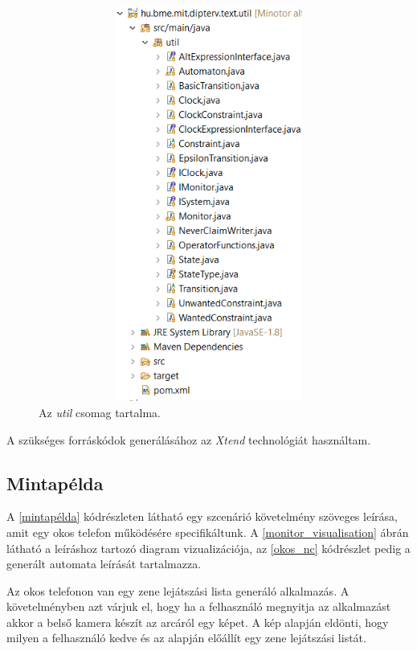 \begin{figure}[!ht]
    \centering
    \includegraphics[width=180mm, height= 13cm, keepaspectratio]{figures/util_csomag.png}
    \caption{Az \textit{util} csomag tartalma.}
	\label{util_csomag}
\end{figure}

A szükséges forráskódok generálásához az \textit{Xtend} technológiát használtam.

\clearpage\subsection{Mintapélda}

A \ref{mintapélda} kódrészleten látható egy szcenárió követelmény szöveges leírása, amit egy okos telefon működésére specifikáltunk.
A \ref{monitor_visualisation} ábrán látható a leíráshoz tartozó diagram vizualizációja, az \ref{okos_nc} kódrészlet pedig a generált automata leírását tartalmazza.

Az okos telefonon van egy zene lejátszási lista generáló alkalmazás.
A követelményben azt várjuk el, hogy ha a felhasználó megnyitja az alkalmazást akkor a belső kamera készít az arcáról egy képet.
A kép alapján eldönti, hogy milyen a felhasználó kedve és az alapján előállít egy zene lejátszási listát.

